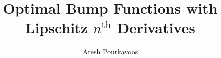 \documentclass{article}
\begin{document}
\title{Optimal Bump Functions with Lipschitz $n^\text{th}$ Derivatives}
\author{Aresh Pourkavoos}
\maketitle

\newtheorem{theorem}{Theorem}[section]
\newtheorem{lemma}{Lemma}[section]
\newtheorem{corollary}{Corollary}[section]
\newcommand{\norm}[1]{\left\Vert #1 \right\Vert}

\end{document}
